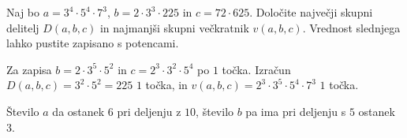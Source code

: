 \documentclass[addpoints,12pt]{exam}
\begin{document}
\begin{questions}

    \newpage

    \question[4]
    Naj bo $a=3^4\cdot 5^4\cdot 7^3$, $b=2\cdot 3^3\cdot 225$ in $c=72\cdot 625$. 
    Določite največji skupni delitelj $D(a,b,c)$ in najmanjši skupni večkratnik $v(a,b,c)$. Vrednost slednjega lahko pustite zapisano s potencami.

    \begin{solution}[8cm]
        Za zapisa $b=2\cdot 3^5\cdot 5^2$ in $c=2^3\cdot 3^2\cdot 5^4$ po $1$ točka. 
        Izračun $D(a,b,c)=3^2\cdot 5^2=225$ $1$ točka, in $v(a,b,c)=2^3\cdot 3^5\cdot 5^4\cdot 7^3$ $1$ točka.
    \end{solution}
    
    
    \newpage
    \question
    Število $a$ da ostanek $6$ pri deljenju z $10$, število $b$ pa ima pri deljenju s $5$ ostanek $3$.




     \newpage

    

\end{questions}
\end{document}

